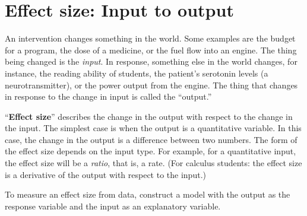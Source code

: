 \documentclass[
  letterpaper,
  DIV=11,
  numbers=noendperiod,
  oneside]{scrreprt}
\begin{document}
\hypertarget{effect-size-input-to-output}{%
\section{Effect size: Input to
output}\label{effect-size-input-to-output}}

An intervention changes something in the world. Some examples are the
budget for a program, the dose of a medicine, or the fuel flow into an
engine. The thing being changed is the \emph{input}. In response,
something else in the world changes, for instance, the reading ability
of students, the patient's serotonin levels (a neurotransmitter), or the
power output from the engine. The thing that changes in response to the
change in input is called the ``output.''

``\textbf{Effect size}'' describes the change in the output with respect
to the change in the input. The simplest case is when the output is a
quantitative variable. In this case, the change in the output is a
difference between two numbers. The form of the effect size depends on
the input type. For example, for a quantitative input, the effect size
will be a \emph{ratio}, that is, a rate. (For calculus students: the
effect size is a derivative of the output with respect to the input.)

To measure an effect size from data, construct a model with the output
as the response variable and the input as an explanatory variable.
\end{document}
